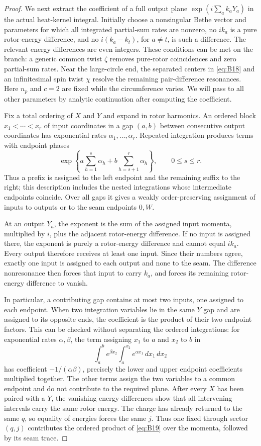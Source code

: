 \begin{proof}
We next extract the coefficient of a full output plane
$\exp(i\sum_a k_aY_a)$ in the actual heat-kernel integral.
Initially choose a nonsingular Bethe vector and parameters for which
all integrated partial-sum rates are nonzero, no $ik_a$ is a pure
rotor-energy difference, and no $i(k_a-k_t)$, for $a\ne t$, is such a
difference.  The relevant energy differences are even integers.
These conditions can be met on the branch: a generic common twist
$\zeta$ removes pure-rotor coincidences and zero partial-sum rates.
Near the large-circle end, the separated centers in \eqref{eq:B18}
and an infinitesimal spin twist $\chi$ resolve the remaining
pair-difference resonances.  Here $n_p$ and $c=2$ are fixed while the
circumference varies.  We will pass to all other parameters by analytic
continuation after computing the coefficient.

Fix a total ordering of $X$ and $Y$ and expand in rotor harmonics.
An ordered block $x_1<\cdots<x_r$ of input coordinates in a gap
$(a,b)$ between consecutive output coordinates has exponential rates
$\alpha_1,\ldots,\alpha_r$.  Repeated integration produces terms with
endpoint phases
\[
 \exp\left\{a\sum_{h=1}^{s}\alpha_h
              +b\sum_{h=s+1}^{r}\alpha_h\right\},
 \qquad 0\le s\le r.
\]
Thus a prefix is assigned to the left endpoint and the remaining
suffix to the right; this description includes the nested integrations
whose intermediate endpoints coincide.  Over all gaps it gives a
weakly order-preserving assignment of inputs to outputs or to the
seam endpoints $0,W$.

At an output $Y_a$, the exponent is the sum of the assigned input
momenta, multiplied by $i$, plus the adjacent rotor-energy difference.
If no input is assigned there, the exponent is purely a rotor-energy
difference and cannot equal $ik_a$.  Every output therefore receives
at least one input.  Since their numbers agree, exactly one input is
assigned to each output and none to the seam.  The difference
nonresonance then forces that input to carry $k_a$, and forces its
remaining rotor-energy difference to vanish.

In particular, a contributing gap contains at most two inputs, one
assigned to each endpoint.  When two integration variables lie in the
same $Y$ gap and are assigned
to its opposite ends, the coefficient is the product of their two
endpoint factors.  This can be checked without separating the ordered
integrations: for exponential rates $\alpha,\beta$, the term assigning
$x_1$ to $a$ and $x_2$ to $b$ in
\[
 \int_a^b e^{\beta x_2}\int_a^{x_2}e^{\alpha x_1}\,dx_1\,dx_2
\]
has coefficient $-1/(\alpha\beta)$, precisely the lower and upper
endpoint coefficients multiplied together.  The other terms assign the
two variables to a common endpoint and do not contribute to the required
plane.  After every $X$ has been paired with a $Y$, the vanishing
energy differences show that all intervening intervals carry the
same rotor energy.  The charge has already returned to the same $q$,
so equality of energies forces the same $j$.
Thus one fixed through sector $(q,j)$ contributes the ordered product of
\eqref{eq:B19} over the momenta, followed by its seam trace.


\end{proof}
